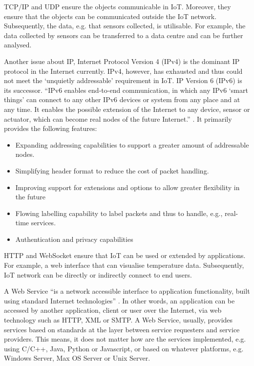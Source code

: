 TCP/IP and UDP ensure the objects communicable in IoT. Moreover, they ensure that the objects can be communicated outside the IoT network. Subsequently, the data, e.g. that sensors collected, is utilisable. For example, the data collected by sensors can be transferred to a data centre and can be further analysed. 

Another issue about IP, Internet Protocol Version 4 (IPv4) is the dominant IP protocol in the Internet currently. IPv4, however, has exhausted \cite{smith2011free} and thus could not meet the `unquietly addressable' requirement in IoT. IP Version 6 (IPv6) is its successor. ``IPv6 enables end-to-end communication, in which any IPv6 `smart things' can connect to any other IPv6 devices or system from any place and at any time. It enables the possible extension of the Internet to any device, sensor or actuator, which can become real nodes of the future Internet.'' \cite{vermesan2011internet}. It primarily provides the following features\cite{deering1998internet}: 

\begin{itemize}
\setlength{\itemsep}{0pt}
\item Expanding addressing capabilities to support a greater amount of addressable nodes. 
\item Simplifying header format to reduce the cost of packet handling.
\item Improving support for extensions and options to allow greater flexibility in the future
\item Flowing labelling capability to label packets and thus to handle, e.g., real-time services.
\item Authentication and privacy capabilities
\end{itemize}

HTTP and WebSocket ensure that IoT can be used or extended by applications. For example, a web interface that can visualise temperature data. Subsequently, IoT network can be directly or indirectly connect to end users. 

A Web Service ``is a network accessible interface to application functionality, built using standard Internet technologies'' \cite{snell2009programming}. In other words, an application can be accessed by another application, client or user over the Internet, via web technology such as HTTP, XML or SMTP. A Web Service, usually, provides services based on standards at the layer between service requesters and service providers. This means, it does not matter how are the services implemented, e.g. using C/C++, Java, Python or Javascript, or based on whatever platforms, e.g. Windows Server, Max OS Server or Unix Server. 

